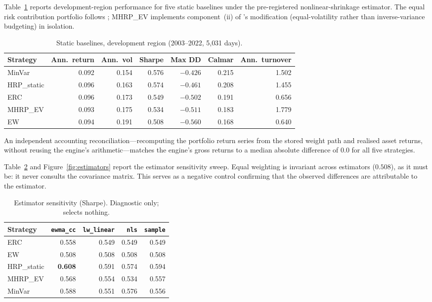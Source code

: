 \documentclass[12pt,letterpaper]{article}
\begin{document}
Table~\ref{tab:baselines} reports development-region performance for five static
baselines under the pre-registered nonlinear-shrinkage estimator. The equal risk
contribution portfolio follows \citet{roncalli2013}; MHRP\_EV implements component~(ii)
of \citeauthor{molyboga2020}'s modification (equal-volatility rather than
inverse-variance budgeting) in isolation.

\begin{table}[htbp]
\centering
\caption{Static baselines, development region (2003--2022, 5{,}031 days).}
\label{tab:baselines}
\small
\begin{tabular}{lrrrrrr}
\toprule
Strategy & Ann.\ return & Ann.\ vol & Sharpe & Max DD & Calmar & Ann.\ turnover \\
\midrule
MinVar     & 0.092 & 0.154 & 0.576 & $-0.426$ & 0.215 & 1.502 \\
HRP\_static & 0.096 & 0.163 & 0.574 & $-0.461$ & 0.208 & 1.455 \\
ERC        & 0.096 & 0.173 & 0.549 & $-0.502$ & 0.191 & 0.656 \\
MHRP\_EV   & 0.093 & 0.175 & 0.534 & $-0.511$ & 0.183 & 1.779 \\
EW         & 0.094 & 0.191 & 0.508 & $-0.560$ & 0.168 & 0.640 \\
\bottomrule
\end{tabular}
\end{table}

An independent accounting reconciliation---recomputing the portfolio return series
from the stored weight path and realised asset returns, without reusing the engine's
arithmetic---matches the engine's gross returns to a median absolute difference of
$0.0$ for all five strategies.

Table~\ref{tab:estimators} and Figure~\ref{fig:estimators} report the estimator
sensitivity sweep. Equal weighting is invariant across estimators ($0.508$), as it
must be: it never consults the covariance matrix. This serves as a negative control
confirming that the observed differences are attributable to the estimator.

\begin{table}[htbp]
\centering
\caption{Estimator sensitivity (Sharpe). Diagnostic only; selects nothing.}
\label{tab:estimators}
\small
\begin{tabular}{lrrrr}
\toprule
Strategy & \texttt{ewma\_cc} & \texttt{lw\_linear} & \texttt{nls} & \texttt{sample} \\
\midrule
ERC        & 0.558 & 0.549 & 0.549 & 0.549 \\
EW         & 0.508 & 0.508 & 0.508 & 0.508 \\
HRP\_static & \textbf{0.608} & 0.591 & 0.574 & 0.594 \\
MHRP\_EV   & 0.568 & 0.554 & 0.534 & 0.557 \\
MinVar     & 0.588 & 0.551 & 0.576 & 0.556 \\
\bottomrule
\end{tabular}
\end{table}
\end{document}
